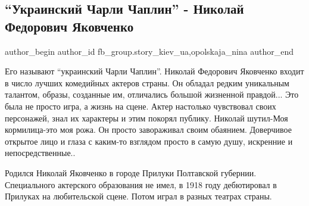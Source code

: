  
 
 
 
 
 
\subsection{\enquote{Украинский Чарли Чаплин} - Николай Федорович Яковченко}
\label{sec:14_12_2021.fb.fb_group.story_kiev_ua.2.jakovchenko_chaplin}
 
\ifcmt
 author_begin
   author_id fb_group.story_kiev_ua,opolskaja_nina
 author_end
\fi

Его называют \enquote{украинский Чарли Чаплин}. Николай Федорович Яковченко
входит в число лучших комедийных актеров страны. Он обладал редким уникальным
талантом, образы, созданные им, отличались большой жизненной правдой... Это
была не просто игра, а жизнь на сцене. Актер настолько чувствовал своих
персонажей, знал их характеры и этим покорял публику. Николай шутил-Моя
кормилица-это моя рожа.  Он просто завораживал своим обаянием. Доверчивое
открытое лицо и глаза с каким-то взглядом просто в самую душу, искренние и
непосредственные.. 

Родился Николай Яковченко в городе Прилуки Полтавской губернии. Специального
актерского образования не имел, в 1918 году дебютировал в Прилуках на
любительской сцене.  Потом играл в разных театрах страны. 

\begin{multicols}{2} %
\setlength{\parindent}{0pt}




\end{multicols} %

